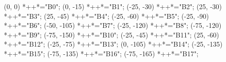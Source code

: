 \begin{scriptsize}
\xy(0, 0)
	*++{}*\frm{-,}="B0";
(0, -15)
	*++{}*\frm{-,}="B1";
(-25, -30)
	*++{}*\frm{-,}="B2";
(25, -30)
	*++{}*\frm{-,}="B3";
(25, -45)
	*++{}*\frm{-,}="B4";
(-25, -60)
	*++{}*\frm{-,}="B5";
(-25, -90)
	*++{}*\frm{-,}="B6";
(-50, -105)
	*++{}*\frm{-,}="B7";
(-25, -120)
	*++{}*\frm{-,}="B8";
(-75, -120)
	*++{}*\frm{-,}="B9";
(-75, -150)
	*++{}*\frm{-,}="B10";
(-25, -45)
	*++{}*\frm{-,}="B11";
(25, -60)
	*++{}*\frm{-,}="B12";
(-25, -75)
	*++{}*\frm{-,}="B13";
(0, -105)
	*++{}*\frm{-,}="B14";
(-25, -135)
	*++{}*\frm{-,}="B15";
(-75, -135)
	*++{}*\frm{-,}="B16";
(-75, -165)
	*++{}*\frm{-,}="B17";

\end{scriptsize}
